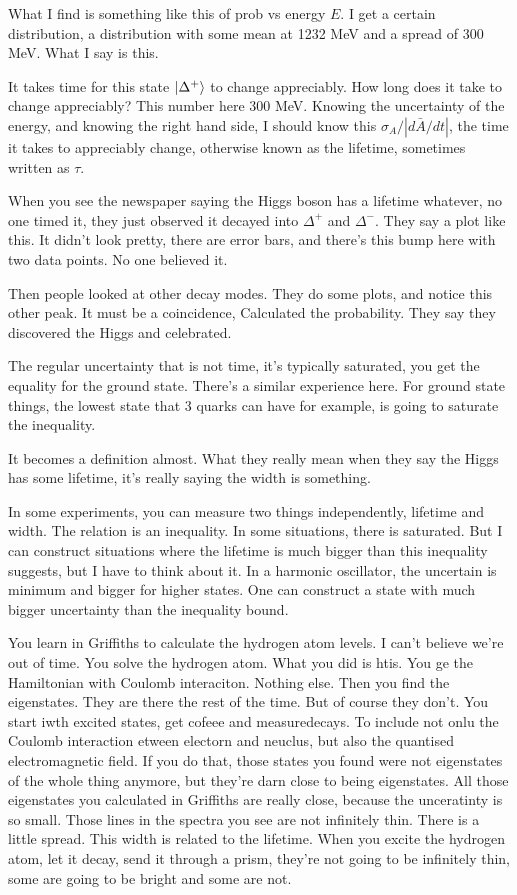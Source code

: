 What I find is something like this of prob vs energy $E$.
I get a certain distribution,
a distribution with some mean at 1232 MeV
and a spread of 300 MeV.
What I say is this.

It takes time for this state $\ket{\Delta^+}$
to change appreciably.
How long does it take to change appreciably?
This number here 300 MeV.
Knowing the uncertainty of the energy,
and knowing the right hand side,
I should know this $\sigma_A/|d\bar{A}/dt|$,
the time it takes to appreciably change,
otherwise known as the lifetime,
sometimes written as $\tau$.

When you see the newspaper saying the Higgs boson has a lifetime whatever,
no one timed it,
they just observed it decayed into $\Delta^+$ and $\Delta^-$.
They say a plot like this.
It didn't look pretty,
there are error bars,
and there's this bump here with two data points.
No one believed it.

Then people looked at other decay modes.
They do some plots,
and notice this other peak.
It must be a coincidence,
Calculated the probability.
They say they discovered the Higgs and celebrated.

The regular uncertainty that is not time,
it's typically saturated,
you get the equality for the ground state.
There's a similar experience here.
For ground state things,
the lowest state that 3 quarks can have for example,
is going to saturate the inequality.

It becomes a definition almost.
What they really mean when they say the Higgs has some lifetime,
it's really saying the width is something.

In some experiments,
you can measure two things independently,
lifetime and width.
The relation is an inequality.
In some situations,
there is saturated.
But I can construct situations where the lifetime is much bigger than this
inequality suggests,
but I have to think about it.
In a harmonic oscillator,
the uncertain is minimum and bigger for higher states.
One can construct a state with much bigger uncertainty than the inequality
bound.

You learn in Griffiths to calculate the hydrogen atom levels.
I can't believe we're out of time.
You solve the hydrogen atom.
What you did is htis.
You ge the Hamiltonian with Coulomb interaciton.
Nothing else.
Then you find the eigenstates.
They are there the rest of the time.
But of course they don't.
You start iwth excited states,
get cofeee
and measuredecays.
To include not onlu the Coulomb interaction etween electorn and neuclus,
but also the quantised electromagnetic field.
If you do that,
those states you found were not eigenstates of the whole thing anymore,
but they're darn close to being eigenstates.
All those eigenstates you calculated in Griffiths are really close,
because the unceratinty is so small.
Those lines in the spectra you see are not infinitely thin.
There is a little spread.
This width is related to the lifetime.
When you excite the hydrogen atom,
let it decay,
send it through a prism,
they're not going to be infinitely thin,
some are going to be bright and some are not.

